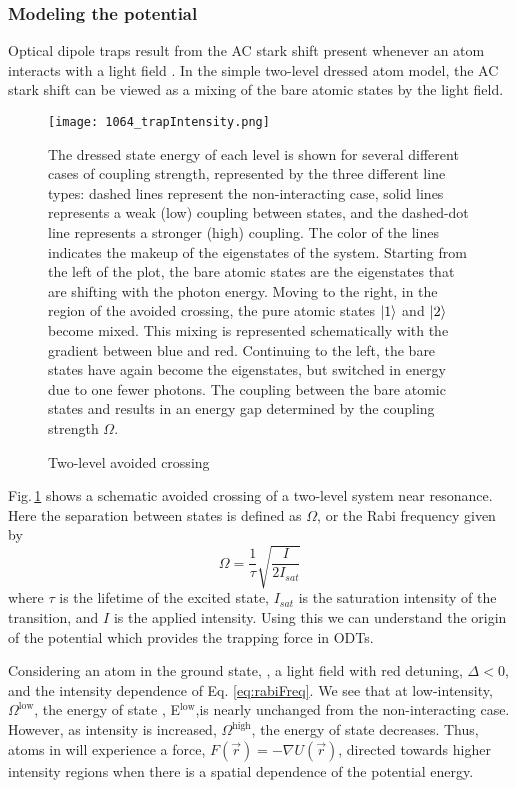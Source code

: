 \subsubsection{Modeling the potential} \label{sssec:1064_modeling}
Optical dipole traps result from the AC stark shift present whenever an atom interacts with a light field \cite{Grimm1999a}.
In the simple two-level dressed atom model, the AC stark shift can be viewed as a mixing of the bare atomic states by the light field.
	\begin{figure} 
		\centerline{
		\texttt{[image: 1064\_trapIntensity.png]}}
		\caption{Two-level avoided crossing}{The dressed state energy of each level is shown for several different cases of coupling strength, represented by the three different line types: dashed lines represent the non-interacting case, solid lines represents a weak (low) coupling between states, and the dashed-dot line represents a stronger (high) coupling. The color of the lines indicates the makeup of the eigenstates of the system. Starting from the left of the plot, the bare atomic states are the eigenstates that are shifting with the photon energy. Moving to the right, in the region of the avoided crossing, the pure atomic states $\left| {1} \right>$ and $\left| {2} \right>$ become mixed. This mixing is represented schematically with the gradient between blue and red. Continuing to the left, the bare states have again become the eigenstates, but switched in energy due to one fewer photons. The coupling between the bare atomic states  and  results in an energy gap determined by the coupling strength $\Omega$.}
		\label{fig:avoidedCrossing}
	\end{figure}
Fig.\,\ref{fig:avoidedCrossing} shows a schematic avoided crossing of a two-level system near resonance.
Here the separation between states is defined as $\Omega$, or the Rabi frequency given by
\begin{equation}
	\Omega = \frac{1}{\tau} \sqrt{\frac{I}{2I_{sat}}}
	\label{eq:rabiFreq}
\end{equation}
where $\tau$ is the lifetime of the excited state, $I_{sat}$ is the saturation intensity of the transition, and $I$ is the applied intensity.
Using this we can understand the origin of the potential which provides the trapping force in ODTs.

Considering an atom in the ground state, , a light field with red detuning, $\Delta < 0$, and the intensity dependence of Eq. \ref{eq:rabiFreq}.
We see that at low-intensity, $\Omega^{\text{low}}$, the energy of state , E$^{\text{low}}$,is nearly unchanged from the non-interacting case.
However, as intensity is increased, $\Omega^{\text{high}}$, the energy of state  decreases. 
Thus, atoms in  will experience a force, $F(\vec{r}) = -\nabla U(\vec{r})$, directed towards higher intensity regions when there is a spatial dependence of the potential energy.

